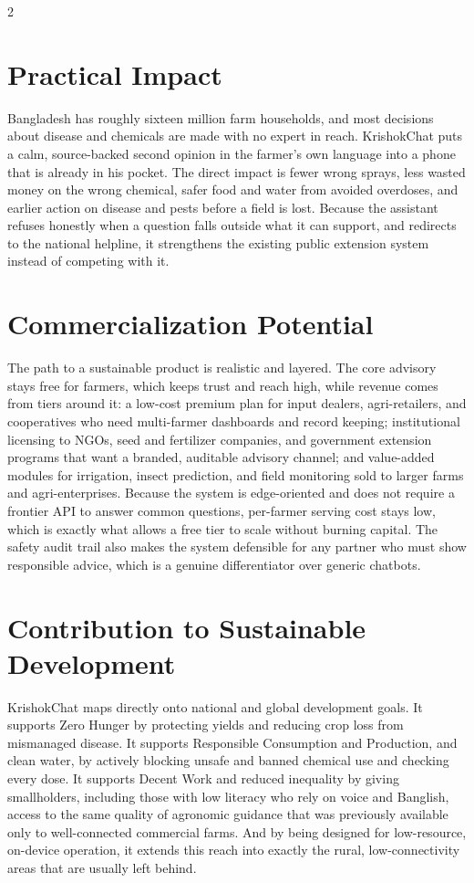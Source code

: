 \documentclass[11pt]{article}
\begin{document}
\begin{multicols}{2}
\section{Practical Impact}

Bangladesh has roughly sixteen million farm households, and most decisions about disease and chemicals are made with no expert in reach. KrishokChat puts a calm, source-backed second opinion in the farmer's own language into a phone that is already in his pocket. The direct impact is fewer wrong sprays, less wasted money on the wrong chemical, safer food and water from avoided overdoses, and earlier action on disease and pests before a field is lost. Because the assistant refuses honestly when a question falls outside what it can support, and redirects to the national helpline, it strengthens the existing public extension system instead of competing with it.

\section{Commercialization Potential}

The path to a sustainable product is realistic and layered. The core advisory stays free for farmers, which keeps trust and reach high, while revenue comes from tiers around it: a low-cost premium plan for input dealers, agri-retailers, and cooperatives who need multi-farmer dashboards and record keeping; institutional licensing to NGOs, seed and fertilizer companies, and government extension programs that want a branded, auditable advisory channel; and value-added modules for irrigation, insect prediction, and field monitoring sold to larger farms and agri-enterprises. Because the system is edge-oriented and does not require a frontier API to answer common questions, per-farmer serving cost stays low, which is exactly what allows a free tier to scale without burning capital. The safety audit trail also makes the system defensible for any partner who must show responsible advice, which is a genuine differentiator over generic chatbots.

\section{Contribution to Sustainable Development}

KrishokChat maps directly onto national and global development goals. It supports Zero Hunger by protecting yields and reducing crop loss from mismanaged disease. It supports Responsible Consumption and Production, and clean water, by actively blocking unsafe and banned chemical use and checking every dose. It supports Decent Work and reduced inequality by giving smallholders, including those with low literacy who rely on voice and Banglish, access to the same quality of agronomic guidance that was previously available only to well-connected commercial farms. And by being designed for low-resource, on-device operation, it extends this reach into exactly the rural, low-connectivity areas that are usually left behind.


\end{multicols}
\end{document}
